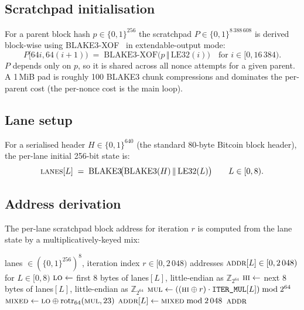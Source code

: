 \documentclass[11pt,a4paper]{article}
\theoremstyle{plain}
\theoremstyle{definition}
\theoremstyle{remark}
\begin{document}
\subsection{Scratchpad initialisation}\label{sec:algo-init}

For a parent block hash $p\in\{0,1\}^{256}$ the scratchpad
$P\in\{0,1\}^{8\,388\,608}$ is derived block-wise using
BLAKE3-XOF~\cite{oconnor2020blake3} in extendable-output mode:
$$
P[64i, 64(i{+}1)) \;=\; \mathrm{BLAKE3\text{-}XOF}\!\bigl(p \,\Vert\,
\mathrm{LE32}(i)\bigr)\quad \text{for } i\in[0,16\,384).
$$
$P$ depends only on $p$, so it is shared across all nonce attempts
for a given parent. A 1\,MiB pad is roughly 100 BLAKE3 chunk
compressions and dominates the per-parent cost (the per-nonce cost
is the main loop).

\subsection{Lane setup}\label{sec:algo-lanes}

For a serialised header $H\in\{0,1\}^{640}$ (the standard 80-byte
Bitcoin block header), the per-lane initial 256-bit state is:
$$
\textsc{lanes}[L] \;=\; \mathrm{BLAKE3}\!\bigl(\mathrm{BLAKE3}(H)
\,\Vert\, \mathrm{LE32}(L)\bigr) \qquad L\in[0,8).
$$

\subsection{Address derivation}\label{sec:algo-addr}

The per-lane scratchpad block address for iteration $r$ is computed
from the lane state by a multiplicatively-keyed mix:

\begin{algorithm}[t]
\caption{\textsc{DeriveAddresses}; the per-iteration per-lane address
function.}
\label{alg:addr}
\begin{algorithmic}[1]
\Require lanes $\in (\{0,1\}^{256})^8$, iteration index
         $r\in [0, 2\,048)$
\Ensure addresses $\textsc{addr}[L]\in [0, 2\,048)$ for
        $L\in[0,8)$
  \State $\textsc{lo} \gets $ first 8 bytes of lanes$[L]$,
         little-endian as $\mathbb{Z}_{2^{64}}$
  \State $\textsc{hi} \gets $ next 8 bytes of lanes$[L]$,
         little-endian as $\mathbb{Z}_{2^{64}}$
  \State $\textsc{mul} \gets ((\textsc{hi} \oplus r) \cdot
         \texttt{ITER\_MUL}[L]) \bmod 2^{64}$
  \State $\textsc{mixed} \gets \textsc{lo} \oplus
         \mathrm{rotr}_{64}(\textsc{mul}, 23)$
  \State $\textsc{addr}[L] \gets \textsc{mixed} \bmod 2\,048$
\EndFor
\State \Return $\textsc{addr}$
\end{algorithmic}
\end{algorithm}
\end{document}
